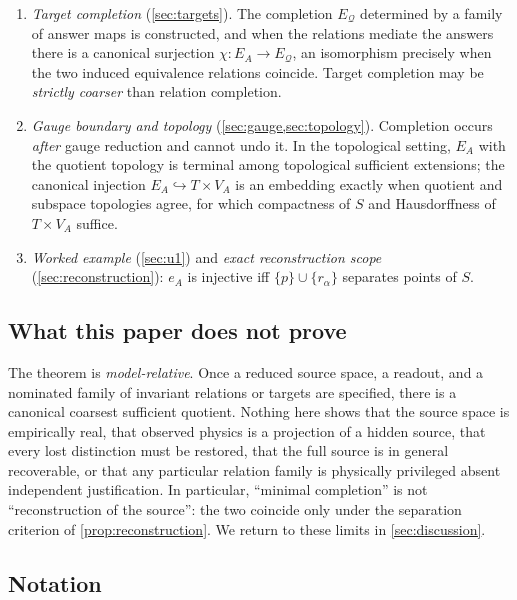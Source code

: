 \documentclass[11pt,reqno]{amsart}
\theoremstyle{plain}
\theoremstyle{definition}
\theoremstyle{remark}
\numberwithin{equation}{section}
\begin{document}
\begin{enumerate}
\item \emph{Target completion} (\cref{sec:targets}). The completion $E_{\mathcal Q}$ determined by a
family of answer maps is constructed, and when the relations mediate the answers there is a
canonical surjection $\chi\colon E_A\to E_{\mathcal Q}$, an isomorphism precisely when the two
induced equivalence relations coincide. Target completion may be \emph{strictly coarser} than
relation completion.

\item \emph{Gauge boundary and topology} (\cref{sec:gauge,sec:topology}). Completion occurs
\emph{after} gauge reduction and cannot undo it. In the topological setting, $E_A$ with the quotient
topology is terminal among topological sufficient extensions; the canonical injection
$E_A\hookrightarrow T\times V_A$ is an embedding exactly when quotient and subspace topologies
agree, for which compactness of $S$ and Hausdorffness of $T\times V_A$ suffice.

\item \emph{Worked example} (\cref{sec:u1}) and \emph{exact reconstruction scope}
(\cref{sec:reconstruction}): $e_A$ is injective iff $\{p\}\cup\{r_\alpha\}$ separates points of $S$.
\end{enumerate}

\subsection{What this paper does not prove}
\label{subsec:scope-front}

The theorem is \emph{model-relative}. Once a reduced source space, a readout, and a nominated
family of invariant relations or targets are specified, there is a canonical coarsest sufficient
quotient. Nothing here shows that the source space is empirically real, that observed physics is a
projection of a hidden source, that every lost distinction must be restored, that the full source is
in general recoverable, or that any particular relation family is physically privileged absent
independent justification. In particular, ``minimal completion'' is not ``reconstruction of the
source'': the two coincide only under the separation criterion of
\cref{prop:reconstruction}. We return to these limits in \cref{sec:discussion}.

\subsection{Notation}
\end{document}
